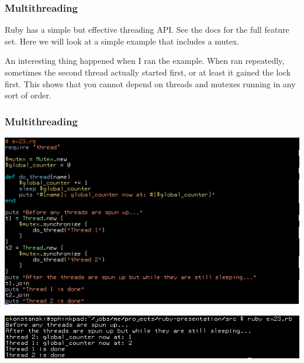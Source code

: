 \documentclass[helvetica,english,utf8,notitle,nologo]{beamer}
\begin{document}
\begin{frame}
  \frametitle{Multithreading}

  Ruby has a simple but effective threading API. See the docs for the
  full feature set. Here we will look at a simple example that
  includes a mutex.

  An interesting thing happened when I ran the example. When ran
  repeatedly, sometimes the second thread actually started first, or
  at least it gained the lock first. This shows that you cannot depend
  on threads and mutexes running in any sort of order.
\end{frame}

\begin{frame}
  \frametitle{Multithreading}

  \includegraphics[scale=0.53]{src_23}

  \includegraphics[scale=0.5]{out_23}
\end{frame}
\end{document}
